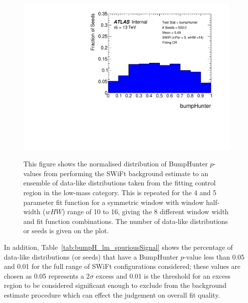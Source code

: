 \begin{figure}[!htb]
{}                                                                                              
 {                                                    
  \includegraphics[width=0.45\linewidth, angle=0]{figs/Dibjet/LowMass/FitStudy/pVal_bumpHunter_corrFitCR_5para_low14_high14.pdf}
}                                                                                              
\vspace{10pt}
\caption{\label{fig:bumpH_spuriousSignal}
  This figure shows the normalised distribution of {\sc BumpHunter} \mbox{$p$-value}s from performing the SWiFt background estimate to an ensemble of
  data-like distributions taken from the fitting control region in the low-mass category.
  This is repeated for the 4 and 5 parameter fit function for a symmetric window with window half-width ($wHW$) range of 10 to 16,
  giving the 8 different window width and fit function combinations.
  The number of data-like distributions or seeds is given on the plot.
}
\end{figure}


In addition, Table~\ref{tab:bumpH_lm_spuriousSignal} shows the percentage of data-like distributions (or seeds)
that have a {\sc BumpHunter} \mbox{$p$-value} less than %
0.05 and 0.01 for the full range of SWiFt configurations considered;
these values are chosen as 0.05 represents a 2$\sigma$ excess and
0.01 is the threshold for an excess region to be considered significant enough
to exclude from the background estimate procedure which can effect the judgement on overall fit quality.


